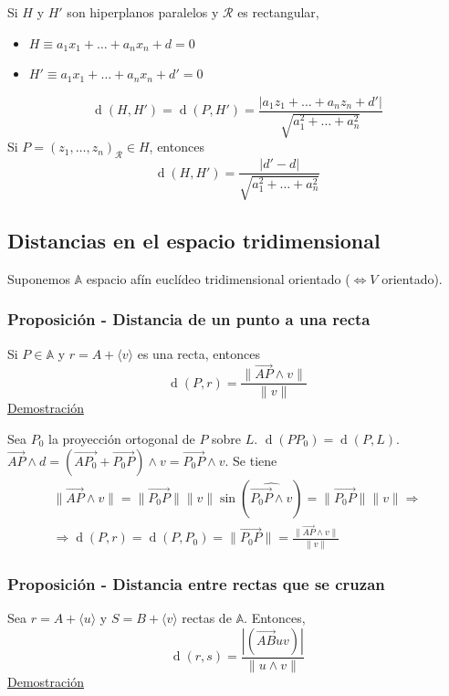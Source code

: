 \documentclass[12pt, a4paper, ones, notitlepage, openany,titlepage]{article}
\newcommand{\demostracion}{\noindent\underline{Demostración}}
\newcommand{\distancia}[1]{\operatorname{d}(#1)}
\begin{document}
Si $H$ y $H'$ son hiperplanos paralelos y $\mathcal{R}$ es rectangular,
\begin{itemize}
	\item $H \equiv a_1 x_1 + \ldots + a_n x_n + d = 0$
	\item $H' \equiv a_1 x_1 + \ldots + a_n x_n + d' = 0$
\end{itemize}
$$
\distancia{H,H'} = \distancia{P,H'} = \frac{|a_1 z_1 + \ldots + a_n z_n + d'|}{\sqrt{a_1^2 + \ldots + a_n^2}}
$$
Si $P = (z_1, \ldots, z_n)_\mathcal{R} \in H$, entonces
$$
\distancia{H,H'} = \frac{|d' - d|}{\sqrt{a_1^2 + \ldots + a_n^2}}
$$

\subsection{Distancias en el espacio tridimensional}
Suponemos $\mathbb{A}$ espacio afín euclídeo tridimensional orientado ($\Longleftrightarrow V$ orientado).

\subsubsection{Proposición - Distancia de un punto a una recta}
Si $P \in \mathbb{A}$ y $r = A + \langle v \rangle$ es una recta, entonces
$$
\distancia{P,r} = \frac{\|\overrightarrow{AP} \wedge v\|}{\|v\|}
$$
\demostracion

Sea $P_0$ la proyección ortogonal de $P$ sobre $L$. $\distancia{PP_0} = \distancia{P,L}$. $\overrightarrow{AP} \wedge d = (\overrightarrow{AP_0} + \overrightarrow{P_0P}) \wedge v = \overrightarrow{P_0P} \wedge v$. Se tiene
\begin{gather*}
	\|\overrightarrow{AP} \wedge v\| = \|\overrightarrow{P_0P}\| \|v\| \sin(\widehat{\overrightarrow{P_0P} \wedge v}) = \|\overrightarrow{P_0P}\| \|v\| \Longrightarrow \\
	\Longrightarrow \distancia{P,r} = \distancia{P,P_0} = \|\overrightarrow{P_0P}\| = \frac{\|\overrightarrow{AP} \wedge v\|}{\|v\|}
\end{gather*}

\subsubsection{Proposición - Distancia entre rectas que se cruzan}
Sea $r = A + \langle u \rangle$ y $S = B + \langle v \rangle$ rectas de $\mathbb{A}$. Entonces,
$$
\distancia{r,s} = \frac{|(\overrightarrow{AB} u v)|}{\|u \wedge v\|}
$$
\demostracion
\end{document}

